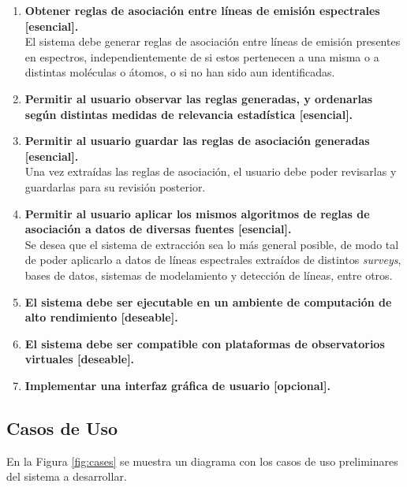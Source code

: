 \begin{enumerate}
	\item \textbf{Obtener reglas de asociación entre líneas de emisión espectrales [esencial].} \\
	El sistema debe generar reglas de asociación entre líneas de emisión presentes en espectros, independientemente de si estos pertenecen a una misma o a distintas moléculas o átomos, o si no han sido aun identificadas.
	\item \textbf{Permitir al usuario observar las reglas generadas, y ordenarlas según distintas medidas de relevancia estadística [esencial].} \\
	\item \textbf{Permitir al usuario guardar las reglas de asociación generadas [esencial].} \\
	Una vez extraídas las reglas de asociación, el usuario debe poder revisarlas y guardarlas para su revisión posterior.
	\item \textbf{Permitir al usuario aplicar los mismos algoritmos de reglas de asociación a datos de diversas fuentes [esencial].} \\
	Se desea que el sistema de extracción sea lo más general posible, de modo tal de poder aplicarlo a datos de líneas espectrales extraídos de distintos \textit{surveys}, bases de datos, sistemas de modelamiento y detección de líneas, entre otros.
	\item \textbf{El sistema debe ser ejecutable en un ambiente de computación de alto rendimiento [deseable].}
	\item \textbf{El sistema debe ser compatible con plataformas de observatorios virtuales [deseable].} 
	\item \textbf{Implementar una interfaz gráfica de usuario [opcional].}
\end{enumerate}

\subsection{Casos de Uso}

En la Figura \ref{fig:cases} se muestra un diagrama con los casos de uso preliminares del sistema a desarrollar.


